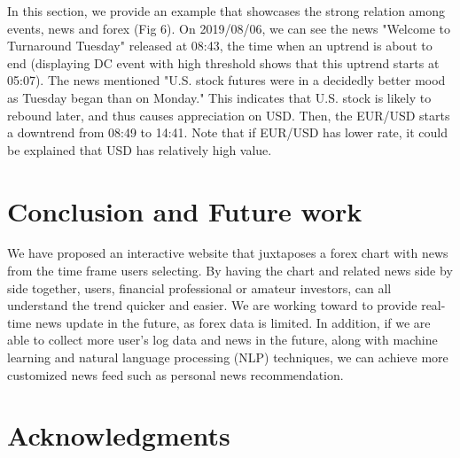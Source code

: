 \documentclass[sigconf]{acmart}
\begin{document}
In this section, we provide an example that showcases the strong relation among events, news and forex (Fig 6). On 2019/08/06, we can see the news "Welcome to Turnaround Tuesday" released at 08:43, the time when an uptrend is about to end (displaying DC event with high threshold shows that this uptrend starts at 05:07). The news mentioned "U.S. stock futures were in a decidedly better mood as Tuesday began than on Monday." This indicates that U.S. stock is likely to rebound later, and thus causes appreciation on USD. Then, the EUR/USD starts a downtrend from 08:49 to 14:41. Note that if EUR/USD has lower rate, it could be explained that USD has relatively high value.



\section{Conclusion and Future work}\label{sec:conclude}
We have proposed an interactive website that juxtaposes a forex chart with news from the time frame users selecting. By having the chart and related news side by side together, users, financial professional or amateur investors, can all understand the trend quicker and easier. We are working toward to provide real-time news update in the future, as forex data is limited. In addition, if we are able to collect more user's log data and news in the future, along with machine learning and natural language processing (NLP) techniques, we can achieve more customized news feed such as personal news recommendation.  

\section{Acknowledgments}





\end{document}
